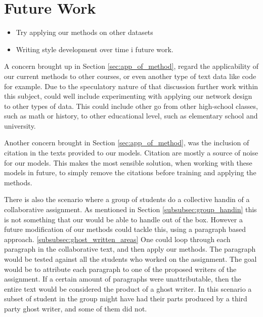 \section{Future Work} \label{sec:future_work}


\begin{itemize}

    \item Try applying our methods on other datasets
    \item Writing style development over time i future work.

\end{itemize}

A concern brought up in Section \ref{sec:app_of_method}, regard the
applicability of our current methods to other courses, or even another type
of text data like code for example. Due to the speculatory nature of that
discussion further work within this subject, could well include experimenting
with applying our network design to other types of data. This could include
other go from other high-school classes, such as math or history, to other
educational level, such as elementary school and university.

Another concern brought in Section \ref{sec:app_of_method}, was the inclusion of
citation in the texts provided to our models. Citation are mostly a source of
noise for our models. This makes the most sensible solution, when working with
these models in future, to simply remove the citations before training and
applying the methods. 

There is also the scenario where a group of students do a collective handin of a
collaborative assignment. As mentioned in Section \ref{subsubsec:group_handin}
this is not something that our would be able to handle out of the box. However
a future modification of our methods could tackle this, using a paragraph based
approach. \ref{subsubsec:ghost_written_areas} One could loop through each
paragraph in the collaborative text, and then apply our methods. The paragraph
would be tested against all the students who worked on the assignment. The goal
would be to attribute each paragraph to one of the proposed writers of the
assignment. If a certain amount of paragraphs were unattributable, then the
entire text would be considered the product of a ghost writer. 
In this scenario a subset of student in the group might have had their parts
produced by a third party ghost writer, and some of them did not.

